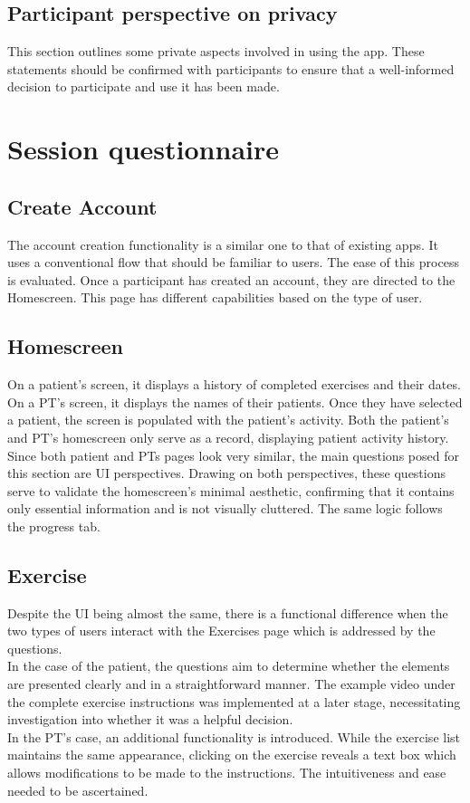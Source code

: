 \documentclass{article} %
\begin{document}
\subsection{\textbf{Participant perspective on privacy}}
This section outlines some private aspects involved in using the app. These statements 
should be confirmed with participants to ensure that a well-informed decision to participate and use it has been made.

\section{Session questionnaire}
\subsection{Create Account}
The account creation functionality is a similar one to that of existing apps. It uses a conventional flow that should be familiar to users.
The ease of this process is evaluated. 
Once a participant has created an account, they are directed to the Homescreen. This page has different capabilities based
on the type of user. \\
\subsection{Homescreen}
On a patient's screen, it displays a history of completed exercises and their dates. %
On a PT's screen, it displays the names of their patients. Once they have selected a patient, the screen is populated
with the patient's activity. Both the patient's and PT's homescreen only serve as a record, displaying patient activity history. 
Since both patient and PTs pages look very similar, the main questions posed for this section are
UI perspectives. Drawing on both perspectives, these questions serve to validate the homescreen's minimal aesthetic,
confirming that it contains only essential information and is not visually cluttered. The same logic follows the progress
tab. \\

\subsection{Exercise}
Despite the UI being almost the same, there is a functional difference when the two types of users 
interact with the Exercises page which is addressed by the questions.\\
In the case of the patient, the questions aim to determine whether the elements are presented clearly and in a straightforward manner.
The example video under the complete exercise instructions was implemented at a later stage, necessitating investigation into whether
it was a helpful decision. \\
In the PT's case, an additional functionality is introduced. While the exercise list maintains the same appearance, clicking on the 
exercise reveals a text box which allows modifications to be made to the instructions. The intuitiveness and ease needed to be ascertained. \\
\end{document}

